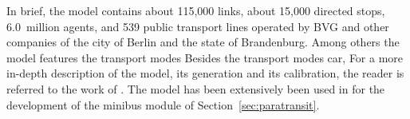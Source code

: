 In
brief, the model contains about 115,000 links, %
about 15,000 directed stops, %
6.0~million agents, %
and 539 public transport lines operated by BVG and other companies of the city
of Berlin and the state of Brandenburg. Among others the model features the transport modes Besides the transport modes car, For a more in-depth description of the
model, its generation and its calibration, the reader is referred to the work of
\cite{NeumannEtAl2014IatbrPtBerlinBook}. The model has been extensively been used in \citet[][Ch 7/8]{Neumann2014PhD} for the development of the minibus module of Section~\ref{sec:paratransit}.



